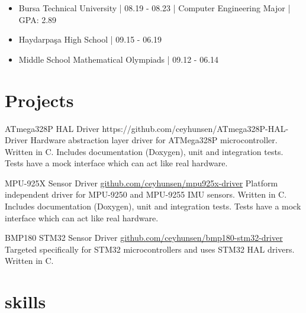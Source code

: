 \documentclass[10pt]{brutalist}
\begin{document}
\begin{itemize}
	\item Bursa Technical University | 08.19 - 08.23 | Computer Engineering Major | GPA: 2.89
	\item Haydarpaşa High School | 09.15 - 06.19
	\item Middle School Mathematical Olympiads | 09.12 - 06.14
\end{itemize}

\section*{Projects}

\projectbox
{ATmega328P HAL Driver}
{https://github.com/ceyhunsen/ATmega328P-HAL-Driver}
{
	Hardware abstraction layer driver for ATMega328P microcontroller. Written in C. Includes documentation (Doxygen), unit and integration tests. Tests have a mock interface which can act like real hardware.
}

\projectbox
{MPU-925X Sensor Driver}
{\href{https://github.com/ceyhunsen/mpu925x-driver}{github.com/ceyhunsen/mpu925x-driver}}
{
	Platform independent driver for MPU-9250 and MPU-9255 IMU sensors. Written in C. Includes documentation (Doxygen), unit and integration tests. Tests have a mock interface which can act like real hardware.
}

\projectbox
{BMP180 STM32 Sensor Driver}
{\href{https://github.com/ceyhunsen/bmp180-stm32-driver}{github.com/ceyhunsen/bmp180-stm32-driver}}
{
	Targeted specifically for STM32 microcontrollers and uses STM32 HAL drivers. Written in C.
}

\section*{skills}
\end{document}
